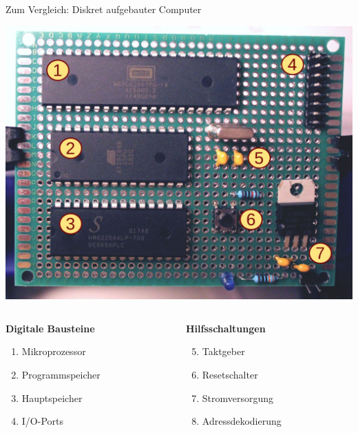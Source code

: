 \begin{frame}{Zum Vergleich: Diskret aufgebauter Computer}
    \begin{center}
        \includegraphics[height=0.5\textheight]{img/sbc_microprozessor2_klein}
    \end{center}

    \medskip

    \begin{columns}
        \begin{column}[T]{.5\textwidth}
            \textbf{Digitale Bausteine}
            \begin{enumerate}
                \item Mikroprozessor
                \item Programmspeicher
                \item Hauptspeicher
                \item I/O-Ports
            \end{enumerate}
        \end{column}
        \begin{column}[T]{.5\textwidth}
            \textbf{Hilfsschaltungen}
            \begin{enumerate}
                \setcounter{enumi}{4}
                \item Taktgeber
                \item Resetschalter
                \item Stromversorgung
                \item Adressdekodierung
            \end{enumerate}
        \end{column}
    \end{columns}
\end{frame}

